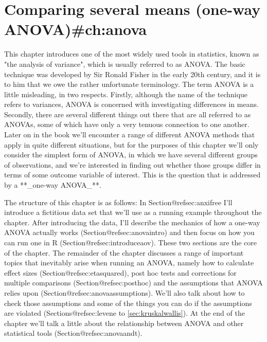 

\chapter{Comparing several means (one-way ANOVA){#ch:anova}}

This chapter introduces one of the most widely used tools in statistics, known as "the analysis of variance", which is usually referred to as ANOVA. The basic technique was developed by Sir Ronald Fisher in the early 20th century, and it is to him that we owe the rather unfortunate terminology. The term ANOVA is a little misleading, in two respects. Firstly, although the name of the technique refers to variances, ANOVA is concerned with investigating differences in means. Secondly, there are several different things out there that are all referred to as ANOVAs, some of which have only a very tenuous connection to one another. Later on in the book we'll encounter a range of different ANOVA methods that apply in quite different situations, but for the purposes of this chapter we'll only consider the simplest form of ANOVA, in which we have several different groups of observations, and we're interested in finding out whether those groups differ in terms of some outcome variable of interest. This is the question that is addressed by a **_one-way ANOVA_**. 

The structure of this chapter is as follows: In Section@refsec:anxifree I'll introduce a fictitious data set that we'll use as a running example throughout the chapter. After introducing the data, I'll describe the mechanics of how a one-way ANOVA actually works (Section@refsec:anovaintro) and then focus on how you can run one in R (Section@refsec:introduceaov). These two sections are the core of the chapter. The remainder of the chapter discusses a range of important topics that inevitably arise when running an ANOVA, namely how to calculate effect sizes (Section@refsec:etasquared), post hoc tests and corrections for multiple comparisons (Section@refsec:posthoc) and the assumptions that ANOVA relies upon (Section@refsec:anovaassumptions). We'll also talk about how to check those assumptions and some of the things you can do if the assumptions are violated (Sections@refsec:levene to \ref{sec:kruskalwallis}). At the end of the chapter we'll talk a little about the relationship between ANOVA and other statistical tools (Section@refsec:anovaandt). 


